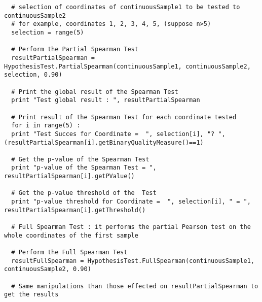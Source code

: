 \begin{lstlisting}
  # selection of coordinates of continuousSample1 to be tested to continuousSample2
  # for example, coordinates 1, 2, 3, 4, 5, (suppose n>5)
  selection = range(5)

  # Perform the Partial Spearman Test
  resultPartialSpearman = HypothesisTest.PartialSpearman(continuousSample1, continuousSample2, selection, 0.90)

  # Print the global result of the Spearman Test
  print "Test global result : ", resultPartialSpearman

  # Print result of the Spearman Test for each coordinate tested
  for i in range(5) :
  print "Test Succes for Coordinate =  ", selection[i], "? ", (resultPartialSpearman[i].getBinaryQualityMeasure()==1)

  # Get the p-value of the Spearman Test
  print "p-value of the Spearman Test = ", resultPartialSpearman[i].getPValue()

  # Get the p-value threshold of the  Test
  print "p-value threshold for Coordinate =  ", selection[i], " = ", resultPartialSpearman[i].getThreshold()

  # Full Spearman Test : it performs the partial Pearson test on the whole coordinates of the first sample

  # Perform the Full Spearman Test
  resultFullSpearman = HypothesisTest.FullSpearman(continuousSample1, continuousSample2, 0.90)

  # Same manipulations than those effected on resultPartialSpearman to get the results
\end{lstlisting}


